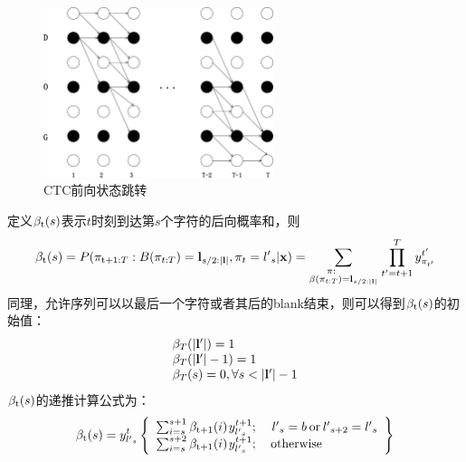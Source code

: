 \begin{figure}[htbp]
\centering
\includegraphics[width=0.6\textwidth]{figures/chapter4/forback-crop}
\caption{CTC前向状态跳转}
\label{fig:ctcforback}
\end{figure}

定义${\beta _{\rm{t}}}(s)$表示$t$时刻到达第$s$个字符的后向概率和，则
\begin{equation}
{\beta _{\rm{t}}}(s) = P({\pi _{{\rm{t}} + 1:T}}:B({\pi _{t:T}}) = {{\bf{l}}_{s/2:{\rm{|}}{\bf{l}}|}},{\pi _t} = {{l'}_s}{\rm{|}}{\bf{x}}{\rm{) = }}\sum\limits_{\scriptstyle{\kern 1pt} {\kern 1pt} {\kern 1pt} {\kern 1pt} {\kern 1pt} {\kern 1pt} {\kern 1pt} {\kern 1pt} {\kern 1pt} {\kern 1pt} {\kern 1pt} {\kern 1pt} {\kern 1pt} {\kern 1pt} \pi :\hfill\atop
\scriptstyle\beta ({\pi _{t:T}}) = {{\bf{l}}_{s/2:{\rm{|}}{\bf{l}}|}}\hfill} {\prod\limits_{t' = t + 1}^T {y_{{\pi _{t'}}}^{t'}} }
\end{equation}
同理，允许序列可以以最后一个字符或者其后的blank结束，则可以得到${\beta _{\rm{t}}}(s)$的初始值：
\begin{equation}
\begin{array}{l}
{\beta _T}(|{\bf{l'}}|) = 1\\
{\beta _T}(|{\bf{l'}}| - 1) = 1\\
{\beta _T}(s) = 0,\forall s < |{\bf{l'}}| - 1
\end{array}
\end{equation}
${\beta _{\rm{t}}}(s)$的递推计算公式为：
\begin{equation}
\label{equation:beta}
{\beta _{\rm{t}}}(s) = y_{{{l'}_s}}^t\left\{ \begin{array}{l}
\sum\nolimits_{i = s}^{s + 1} {{\beta _{{\rm{t + 1}}}}(i){\kern 1pt} y_{{{l'}_s}}^{t + 1};} {\kern 1pt} {\kern 1pt} {\kern 1pt} {\kern 1pt} {\kern 1pt} {\kern 1pt} {\kern 1pt} {\kern 1pt} {\kern 1pt} {\kern 1pt} {\kern 1pt} {\kern 1pt} {\kern 1pt} {{l'}_s} = b{\kern 1pt} {\kern 1pt} {\rm{or}}{\kern 1pt} {\kern 1pt} {{l'}_{s + 2}} = {{l'}_s}\\
\sum\nolimits_{i = s}^{s + 2} {{\beta _{{\rm{t + 1}}}}(i){\kern 1pt} y_{{{l'}_s}}^{t + 1};} {\kern 1pt} {\kern 1pt} {\kern 1pt} {\kern 1pt} {\kern 1pt} {\kern 1pt} {\kern 1pt} {\kern 1pt} {\kern 1pt} {\kern 1pt} {\kern 1pt} {\kern 1pt} {\rm{otherwise}}
\end{array} \right\}
\end{equation}


